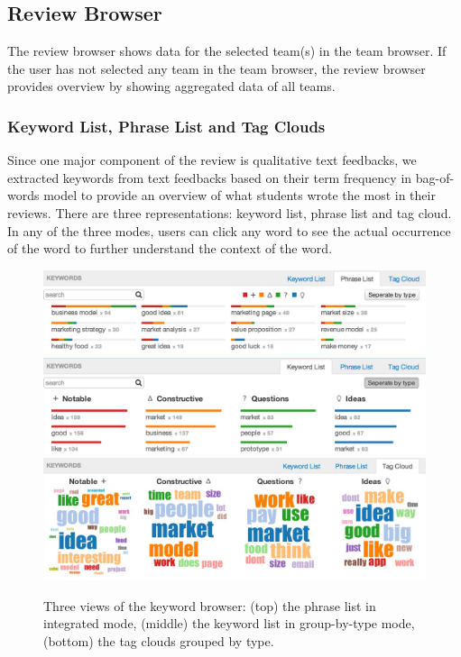 \documentclass{sigchi}
\begin{document}
\subsection{Review Browser}

The review browser shows data for the selected team(s) in the team browser. If
the user has not selected any team in the team browser, the review browser provides overview by showing aggregated data of all teams.

\subsubsection{Keyword List, Phrase List and Tag Clouds}

Since one major component of the review is qualitative text feedbacks,
we extracted keywords from text feedbacks based on their term frequency in bag-of-
words model \cite{bag-of-words} to provide an overview of what students
wrote the most in their reviews.
There are three representations: keyword list, phrase list and tag cloud.
In any of the three modes, users can click any word to see the actual occurrence of the word to further understand the context of the word.


\begin{figure}[b]
\centering
\includegraphics[width=2.0\columnwidth]{images/phrase-list}
\includegraphics[width=2.0\columnwidth]{images/keyword-list}
\includegraphics[width=2.0\columnwidth]{images/clouds}
\caption{Three views of the keyword browser:
(top) the phrase list in integrated mode,
(middle) the keyword list in group-by-type mode,
(bottom) the tag clouds grouped by type.}
\label{fig:keyword-lists}
\end{figure}
\end{document}

